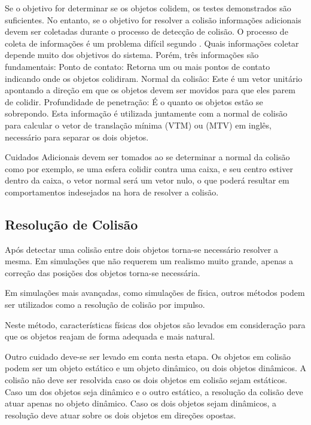 Se o objetivo for determinar  se os objetos colidem, os testes demonstrados são
suficientes. No entanto, se o objetivo for resolver a colisão informações adicionais devem
ser coletadas durante o processo de detecção de colisão. O processo de coleta
de informações é um problema difícil segundo .
Quais informações coletar depende muito dos objetivos do sistema. Porém, três
informações são fundamentais:
Ponto de contato: Retorna um ou mais pontos de contato indicando onde os objetos colidiram.
Normal da colisão: Este é um vetor unitário apontando a direção em que os objetos devem ser movidos para que eles parem de colidir.
Profundidade de penetração: É o quanto os objetos estão se sobrepondo. Esta
informação é utilizada juntamente com a normal de colisão para calcular o vetor
de translação mínima (VTM) ou (MTV) em inglês, necessário para separar os dois
objetos.

Cuidados Adicionais devem ser tomados ao se determinar a normal da colisão como
por exemplo, se uma esfera colidir contra uma caixa, e seu centro estiver
dentro da caixa, o vetor normal será um vetor nulo, o que poderá resultar em
comportamentos indesejados na hora de resolver a colisão.

\subsection{Resolução de Colisão}

Após detectar uma colisão entre dois objetos torna-se necessário resolver
a mesma. Em simulações que não requerem um realismo muito grande, apenas a
correção das posições dos objetos torna-se necessária.

Em simulações mais avançadas, como simulações de física, outros métodos podem
ser utilizados como a resolução de colisão por impulso.

Neste método, características físicas dos objetos são levados em consideração
para que os objetos reajam de forma adequada e mais natural.

Outro cuidado deve-se ser levado em conta nesta etapa.
Os objetos em colisão podem ser um objeto estático e um objeto dinâmico, ou
dois objetos dinâmicos. A colisão não deve ser resolvida caso os dois objetos
em colisão sejam estáticos.
Caso um dos objetos seja dinâmico e o outro estático, a resolução da colisão
deve atuar apenas no objeto dinâmico.
Caso os dois objetos sejam dinâmicos, a resolução deve atuar sobre os dois
objetos em direções opostas.

